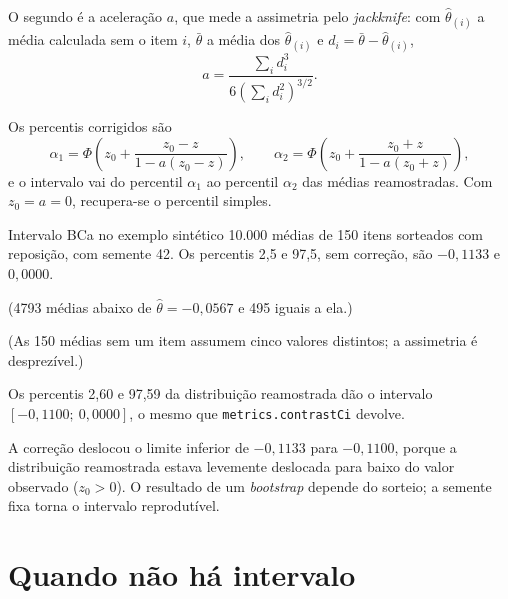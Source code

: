 O segundo é a aceleração $a$, que mede a assimetria pelo \textit{jackknife}:
com $\hat\theta_{(i)}$ a média calculada sem o item $i$,
$\bar\theta$ a média dos $\hat\theta_{(i)}$ e
$d_i = \bar\theta - \hat\theta_{(i)}$,
\begin{equation}
a = \frac{\sum_i d_i^3}{6\left(\sum_i d_i^2\right)^{3/2}}.
\label{eq:apeB_a}
\end{equation}

Os percentis corrigidos são
\begin{equation}
\alpha_1 = \Phi\!\left(z_0 + \frac{z_0 - z}{1 - a(z_0 - z)}\right), \qquad
\alpha_2 = \Phi\!\left(z_0 + \frac{z_0 + z}{1 - a(z_0 + z)}\right),
\label{eq:apeB_alpha}
\end{equation}
e o intervalo vai do percentil $\alpha_1$ ao percentil $\alpha_2$ das médias
reamostradas. Com $z_0 = a = 0$, recupera-se o percentil simples.

\begin{bloco}{Intervalo BCa no exemplo sintético}
10.000 médias de 150 itens sorteados com reposição, com semente 42. Os
percentis 2,5 e 97,5, sem correção, são $-0{,}1133$ e $0{,}0000$.

(4793 médias abaixo de $\hat\theta = -0{,}0567$ e 495 iguais a ela.)

(As 150 médias sem um item assumem cinco valores distintos; a assimetria é
desprezível.)


Os percentis 2,60 e 97,59 da distribuição reamostrada dão o intervalo
$[-0{,}1100;\ 0{,}0000]$, o mesmo que \texttt{metrics.contrastCi} devolve.
\end{bloco}

A correção deslocou o limite inferior de $-0{,}1133$ para $-0{,}1100$, porque
a distribuição reamostrada estava levemente deslocada para baixo do valor
observado ($z_0 > 0$). O resultado de um \textit{bootstrap} depende do
sorteio; a semente fixa torna o intervalo reprodutível.

\section{Quando não há intervalo}\label{sec:apeB_degenera}

